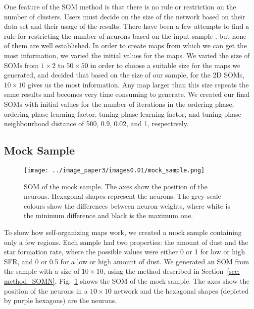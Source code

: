      One feature of the SOM method is that there is no rule or restriction on the number of clusters.
     Users must decide on the size of the network based on their data set and their usage of the results.
     There have been a few attempts to find a rule for restricting the number of neurons based on the input sample \citep[e.g.][]{Vesanto05}, but none of them are well established. 
     In order to create maps from which we can get the most information, we varied the initial values for the maps.
     We varied the size of SOMs from $1\times2$ to $50\times50$ in order to choose a suitable size for the maps we generated, and decided that based on the size of our sample, for the 2D SOMs, $10\times10$ gives us the most information.
     Any map larger than this size repeats the same results and becomes very time consuming to generate.
     We created our final SOMs with initial values for the number of iterations in the ordering phase, ordering phase learning factor, tuning phase learning factor, and tuning phase neighbourhood distance of 500, 0.9, 0.02, and 1, respectively. 
    

\subsection{Mock Sample}
\label{sec: mock_sample}
 
         \begin{figure}
                \centering
                \texttt{[image: ../image\_paper3/images0.01/mock\_sample.png]}
            \caption[Self-organizing map of the mock sample]{SOM of the mock sample. The axes show the position of the neurons. Hexagonal shapes represent the neurons. The grey-scale colours show the differences between neuron weights, where white is the minimum difference and black is the maximum one.}
            \label{fig: sample}
        \end{figure}
 
To show how self-organizing maps work, we created a mock sample containing only a few regions.
Each sample had two properties: the amount of dust and the star formation rate, where the possible values were
either 0 or 1 for low or high SFR, and 0 or 0.5 for a low or high amount of dust. 
 We generated an SOM from the sample with a size of $10 \times 10$, using the method described in Section~\ref{sec: method_SOMN}.
 Fig.~\ref{fig: sample} shows the SOM of the mock sample. 
 The axes show the position of the neurons in a $10 \times 10$ network and the hexagonal shapes (depicted by purple hexagons) are the neurons.
 
